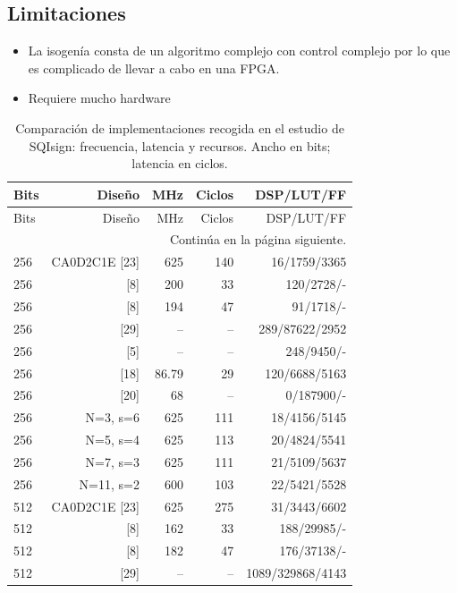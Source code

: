 \subsection*{Limitaciones}
\begin{itemize}
\item La isogenía consta de un algoritmo complejo con control complejo por lo que es complicado de llevar a cabo en una FPGA.
\item Requiere mucho hardware
\end{itemize}

\begingroup
\small
\setlength{\tabcolsep}{3pt}
\setlength{\LTcapwidth}{\textwidth}
\begin{longtable}{lrrrr}
\caption{Comparación de implementaciones recogida en el estudio de SQIsign: frecuencia, latencia y recursos. Ancho en bits; latencia en ciclos.}\label{tab:eval-sqisign}\\
\toprule
Bits & Diseño & MHz & Ciclos & DSP/LUT/FF \\
\midrule
\endfirsthead
\toprule
Bits & Diseño & MHz & Ciclos & DSP/LUT/FF \\
\midrule
\endhead
\midrule
\multicolumn{5}{r}{\small Continúa en la página siguiente.}\\
\endfoot
\bottomrule
\endlastfoot
{256} & {CA0D2C1E [23]} & {625} & {140} & {16/1759/3365} \\
{256} & {[8]} & {200} & {33} & {120/2728/-} \\
{256} & {[8]} & {194} & {47} & {91/1718/-} \\
{256} & {[29]} & {--} & {--} & {289/87622/2952} \\
{256} & {[5]} & {--} & {--} & {248/9450/-} \\
{256} & {[18]} & {86.79} & {29} & {120/6688/5163} \\
{256} & {[20]} & {68} & {--} & {0/187900/-} \\
{256} & {N=3, s=6} & {625} & {111} & {18/4156/5145} \\
{256} & {N=5, s=4} & {625} & {113} & {20/4824/5541} \\
{256} & {N=7, s=3} & {625} & {111} & {21/5109/5637} \\
{256} & {N=11, s=2} & {600} & {103} & {22/5421/5528} \\
{512} & {CA0D2C1E [23]} & {625} & {275} & {31/3443/6602} \\
{512} & {[8]} & {162} & {33} & {188/29985/-} \\
{512} & {[8]} & {182} & {47} & {176/37138/-} \\
{512} & {[29]} & {--} & {--} & {1089/329868/4143} \\

\end{longtable}
